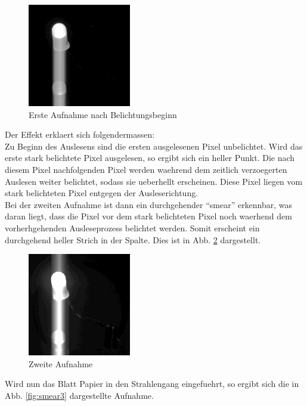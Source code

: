 \begin{figure}[h!]
        \includegraphics[width=.4\textwidth]{smear_unten_sebi.png}
\caption{ Erste Aufnahme nach Belichtungsbeginn }
\label{fig:smear1}
\end{figure}
Der Effekt erklaert sich folgendermassen:\\
Zu Beginn des Auslesens sind die ersten ausgelesenen Pixel unbelichtet. Wird das erste stark belichtete Pixel ausgelesen, so ergibt sich ein heller Punkt. Die nach diesem Pixel nachfolgenden Pixel werden waehrend dem zeitlich verzoegerten Auslesen weiter belichtet, sodass sie ueberhellt erscheinen. Diese Pixel liegen vom stark belichteten Pixel entgegen der Ausleserichtung. \\
Bei der zweiten Aufnahme ist dann ein durchgehender \enquote{smear} erkennbar, was daran liegt, dass die Pixel vor dem stark belichteten Pixel noch waerhend dem vorherhgehenden Ausleseprozess belichtet werden. Somit erscheint ein durchgehend heller Strich in der Spalte. Dies ist in Abb. \ref{fig:smear2} dargestellt. 

\begin{figure}[h!]
        \includegraphics[width=.4\textwidth]{smear.png}
\caption{ Zweite Aufnahme }
\label{fig:smear2}
\end{figure}

Wird nun das Blatt Papier in den Strahlengang eingefuehrt, so ergibt sich die in Abb. \ref{fig:smear3} dargestellte Aufnahme. 

